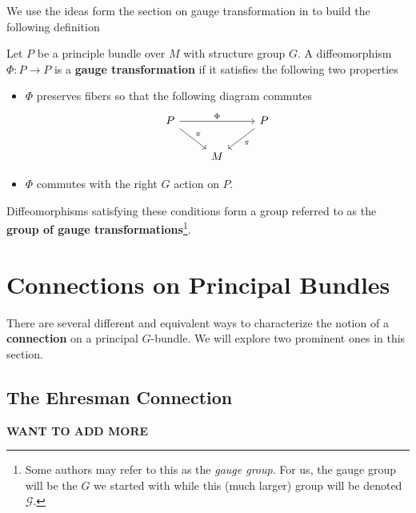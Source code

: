 		We use the ideas form the section on gauge transformation in \cite{lindenhovius2011} to build the following definition
		\begin{defn}
			Let $P$ be a principle bundle over $M$ with structure group $G$. A diffeomorphism $\Phi: P \to P$ is a \textbf{gauge transformation} if it satisfies the following two properties
			\begin{itemize}
				\item $\Phi$ preserves fibers so that the following diagram commutes
				\[
					\begin{tikzcd}
						P \arrow[rr,"\Phi"] \arrow[rd,"\pi"] & & P \arrow[ld,"\pi"]\\
						& M &
					\end{tikzcd}
				\]
				\item $\Phi$ commutes with the right $G$ action on $P$. 
			\end{itemize}
			Diffeomorphisms satisfying these conditions form a group referred to as the \textbf{group of gauge transformations}\footnote{Some authors may refer to this as the \emph{gauge group}. For us, the gauge group will be the $G$ we started with while this (much larger) group will be denoted $\mathcal G$.}. 
		\end{defn}
		
		\section{Connections on Principal Bundles} %
		\label{sec:connections_on_principal_bundles}
		
		There are several different and equivalent ways to characterize the notion of a \textbf{connection} on a principal $G$-bundle. We will explore two prominent ones in this section. 
		
		\subsection{The Ehresman Connection}
		
		\textbf{WANT TO ADD MORE}
		
